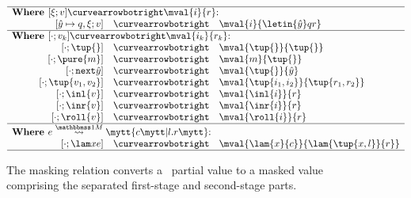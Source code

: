 
\begin{figure}
\begin{abstrsyn}
\[\begin{array}{rrrl}
\hline
\multicolumn{4}{l}  {\text{\bf Where } [\xi;v] \vsplito \mval {i} {r} \text{:}}          \\
\hspace{0.25in} 
&[\hat y \mapsto q,\xi;v]  &\vsplito& \mval  {i}             {\letin {\hat y} q {r}}      \\
\hline
\multicolumn{4}{l}  {\text{\bf Where } [\cdot;v_k] \vsplito \mval {i_k} {r_k} \text{:}}  \\
&[\cdot;\tup{}]            &\vsplito& \mval  {\tup{}}        {\tup{}}                     \\
&[\cdot;\pure{m}]          &\vsplito& \mval  {m}             {\tup{}}                     \\
&[\cdot;\next{\hat y}]     &\vsplito& \mval  {\tup{}}            {\hat y}                     \\
&[\cdot;\tup{v_1,v_2}]         &\vsplito& \mval  {\tup{i_1,i_2}}     {\tup{r_1,r_2}}                  \\
&[\cdot;\inl{v}]           &\vsplito& \mval  {\inl{i}}       {r}                          \\
&[\cdot;\inr{v}]           &\vsplito& \mval  {\inr{i}}       {r}                          \\
&[\cdot;\roll{v}]          &\vsplito& \mval  {\roll{i}}      {r}                          \\
\hline
\multicolumn{4}{l}  {\text{\bf Where } \splitone e A {c}{l.r} \text{:}}                   \\
&[\cdot;\lam xe]           &\vsplito& \mval  {\lam {x} {c}}  {\lam {\tup{x,l}} {r}}			\\
\hline
\end{array}\]
\end{abstrsyn}
\caption{The masking relation converts a \lang\ partial value to a masked value
comprising the separated first-stage and second-stage parts.}
\label{fig:valMask}
\end{figure}
